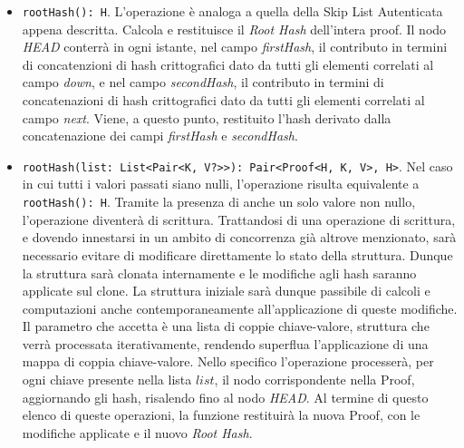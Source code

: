 		\begin{itemize}
			
			\item \verb|rootHash(): H|. L'operazione è analoga a quella della Skip List Autenticata appena descritta. Calcola e restituisce il \textit{Root Hash} dell'intera proof. Il nodo \textit{HEAD} conterrà in ogni istante, nel campo \textit{firstHash}, il contributo in termini di concatenzioni di hash crittografici dato da tutti gli elementi correlati al campo \textit{down}, e nel campo \textit{secondHash}, il contributo in termini di concatenazioni di hash crittografici dato da tutti gli elementi correlati al campo \textit{next}. Viene, a questo punto, restituito l'hash derivato dalla concatenazione dei campi \textit{firstHash} e \textit{secondHash}.
			
			\item \verb|rootHash(list: List<Pair<K, V?>>): Pair<Proof<H, K, V>, H>|. Nel caso in cui tutti i valori passati siano nulli, l'operazione risulta equivalente a \verb|rootHash(): H|. Tramite la presenza di anche un solo valore non nullo, l'operazione diventerà di scrittura. Trattandosi di una operazione di scrittura, e dovendo innestarsi in un ambito di concorrenza già altrove menzionato, sarà necessario evitare di modificare direttamente lo stato della struttura. Dunque la struttura sarà clonata internamente e le modifiche agli hash saranno applicate sul clone. La struttura iniziale sarà dunque passibile di calcoli e computazioni anche contemporaneamente all'applicazione di queste modifiche. Il parametro che accetta è una lista di coppie chiave-valore, struttura che verrà processata iterativamente, rendendo superflua l'applicazione di una mappa di coppia chiave-valore. Nello specifico l'operazione processerà, per ogni chiave presente nella lista $ list $, il nodo corrispondente nella Proof, aggiornando gli hash, risalendo fino al nodo \textit{HEAD}. Al termine di questo elenco di queste operazioni, la funzione restituirà la nuova Proof, con le modifiche applicate e il nuovo \textit{Root Hash}.
			

\end{itemize}
